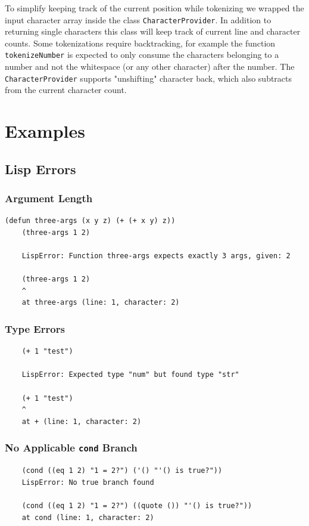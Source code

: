 \documentclass[a4paper,titlepage]{article}
\numberwithin{equation}{section} %
\begin{document}
	To simplify keeping track of the current position while tokenizing we wrapped the input character array inside the class \texttt{CharacterProvider}. In addition to returning single characters this class will keep track of current line and character counts. Some tokenizations require backtracking, for example the function \texttt{tokenizeNumber} is expected to only consume the characters belonging to a number and not the whitespace (or any other character) after the number. The \texttt{CharacterProvider} supports "unshifting" character back, which also subtracts from the current character count.
	
	\newpage
	\section{Examples}
	
	\subsection{Lisp Errors}
	
	\subsubsection{Argument Length}
	\begin{lstlisting}[]
	(defun three-args (x y z) (+ (+ x y) z))
	(three-args 1 2)
	
	LispError: Function three-args expects exactly 3 args, given: 2
	
	(three-args 1 2)
	^
	at three-args (line: 1, character: 2)
	\end{lstlisting}
	\vspace{1cm}
	\subsubsection{Type Errors}
	\begin{lstlisting}
	(+ 1 "test")
	
	LispError: Expected type "num" but found type "str"
	
	(+ 1 "test")
	^
	at + (line: 1, character: 2)
	\end{lstlisting}
	\vspace{1cm}
	
	\subsubsection{No Applicable \texttt{cond} Branch}
	\begin{lstlisting}
	(cond ((eq 1 2) "1 = 2?") ('() "'() is true?"))
	LispError: No true branch found
	
	(cond ((eq 1 2) "1 = 2?") ((quote ()) "'() is true?"))
	at cond (line: 1, character: 2)
	\end{lstlisting}
	
\end{document}
